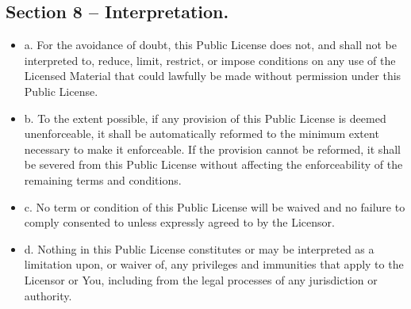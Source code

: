 \subsection*{Section 8 – Interpretation.}
	\begin{itemize}
		\item a. For the avoidance of doubt, this Public License does not, and shall not be interpreted to, reduce, limit, restrict, or impose conditions on any use of the Licensed Material that could lawfully be made without permission under this Public License.
		\item b. To the extent possible, if any provision of this Public License is deemed unenforceable, it shall be automatically reformed to the minimum extent necessary to make it enforceable. If the provision cannot be reformed, it shall be severed from this Public License without affecting the enforceability of the remaining terms and conditions.
		\item c. No term or condition of this Public License will be waived and no failure to comply consented to unless expressly agreed to by the Licensor.
		\item d. Nothing in this Public License constitutes or may be interpreted as a limitation upon, or waiver of, any privileges and immunities that apply to the Licensor or You, including from the legal processes of any jurisdiction or authority.
	\end{itemize}